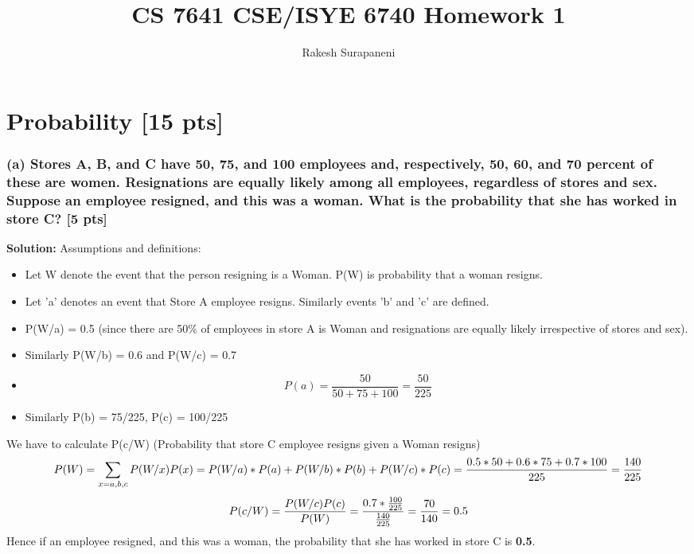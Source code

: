 \documentclass[twoside,10pt]{article}
\begin{document}
\title{CS 7641 CSE/ISYE 6740 Homework 1}
\author{Rakesh Surapaneni}
\maketitle
\section{Probability [15 pts]}
\subsubsection*{(a) Stores A, B, and C have 50, 75, and 100 employees and, respectively, 50, 60, and 70 percent of these are women. Resignations are equally likely among all employees, regardless of stores and sex. Suppose an employee resigned, and this was a woman. What is the probability that she has worked in store C? [5 pts]}

\textbf{ Solution: }
    Assumptions and definitions: \\
\begin{itemize}
    \item Let W denote the event that the person resigning is a Woman. P(W) is probability that a woman resigns. \\
    \item Let 'a' denotes an event that Store A employee resigns. Similarly events 'b' and 'c' are defined.
    \item P(W/a) = 0.5 (since there are 50\% of employees in store A is Woman and resignations are equally likely irrespective of stores and sex).
    \item Similarly P(W/b) = 0.6 and P(W/c) = 0.7
    \item $$P(a) = \frac{50}{50+75+100} = \frac{50}{225}$$
    \item Similarly P(b) = 75/225, P(c) = 100/225
\end{itemize}
We have to calculate P(c/W) (Probability that store C employee resigns given a Woman resigns)\\
\begin{equation} \nonumber
P(W) = \sum_{x = a,b,c}^{} P(W/x)P(x)\\
= P(W/a)*P(a) + P(W/b)*P(b) + P(W/c)*P(c)\\
= \frac{0.5*50+0.6*75+0.7*100}{225} \\
= \frac{140}{225}
\end{equation}
\begin{equation} \nonumber
P(c/W) = \frac{P(W/c)P(c)}{P(W)}\\
=\frac{0.7*\frac{100}{225}}{\frac{140}{225}}\\
= \frac{70}{140}\\
= 0.5
\end{equation}
Hence if an employee resigned, and this was a woman, the probability that she has worked in store C is \textbf{0.5}.
\end{document}

